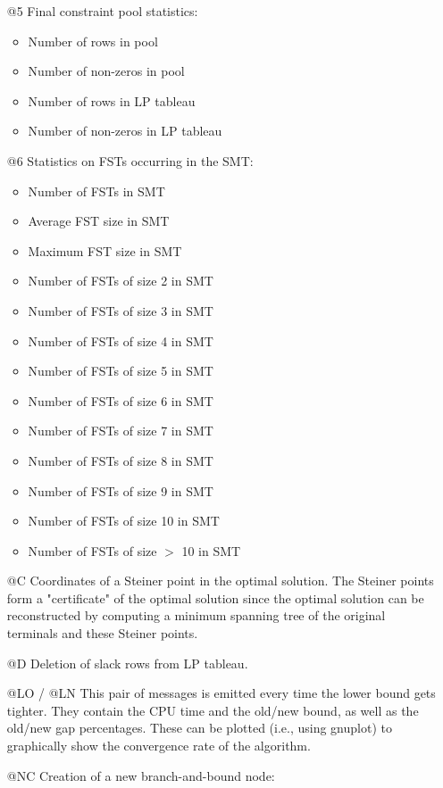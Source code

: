 \documentclass[12pt,twoside,letterpaper]{article}
\def\code#1{{\ttfamily #1}}
\begin{document}
\begin{itemize}
\item[\code{@5}]        Final constraint pool statistics:
 \begin{itemize}
  \item Number of rows in pool
  \item Number of non-zeros in pool
  \item Number of rows in LP tableau
  \item Number of non-zeros in LP tableau
\end{itemize}

\item[\code{@6}]        Statistics on FSTs occurring in the SMT:
 \begin{itemize}
  \item Number of FSTs in SMT
  \item Average FST size in SMT
  \item Maximum FST size in SMT
  \item Number of FSTs of size 2 in SMT
  \item Number of FSTs of size 3 in SMT
  \item Number of FSTs of size 4 in SMT
  \item Number of FSTs of size 5 in SMT
  \item Number of FSTs of size 6 in SMT
  \item Number of FSTs of size 7 in SMT
  \item Number of FSTs of size 8 in SMT
  \item Number of FSTs of size 9 in SMT
  \item Number of FSTs of size 10 in SMT
  \item Number of FSTs of size $>$ 10 in SMT
\end{itemize}

\item[\code{@C}]           Coordinates of a Steiner point in the optimal
        solution.  The Steiner points form a
        "certificate" of the optimal solution since the
        optimal solution can be reconstructed by
        computing a minimum spanning tree of the
        original terminals and these Steiner points.
\item[\code{@D}]    Deletion of slack rows from LP tableau.
\item[\code{@LO} / \code{@LN}]   This pair of messages is emitted every time the
        lower bound gets tighter.  They contain the CPU
        time and the old/new bound, as well as the
        old/new gap percentages.  These can be plotted
        (i.e., using gnuplot) to graphically show the
        convergence rate of the algorithm.
\item[\code{@NC}]   Creation of a new branch-and-bound node:


\end{itemize}
\end{document}
